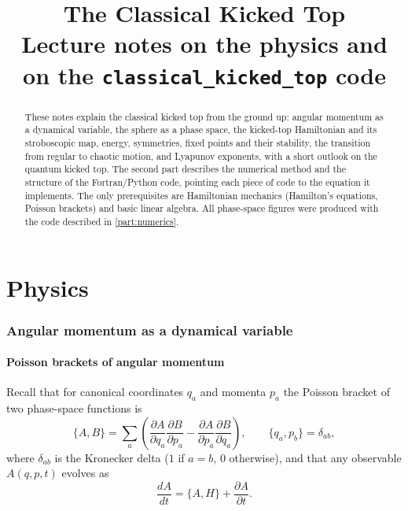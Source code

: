 \documentclass[11pt,a4paper]{article}
\title{The Classical Kicked Top\\[0.3em] \large Lecture notes on the physics and on the \texttt{classical\_kicked\_top} code}
\author{}
\date{}
\newcommand{\PB}[2]{\{#1,#2\}}
\begin{document}
\maketitle

\begin{abstract}
These notes explain the classical kicked top from the ground up: angular momentum as a dynamical variable, the
sphere as a phase space, the kicked-top Hamiltonian and its stroboscopic map, energy, symmetries, fixed points and
their stability, the transition from regular to chaotic motion, and Lyapunov exponents, with a short outlook on the
quantum kicked top. The second part describes the numerical method and the structure of the Fortran/Python code,
pointing each piece of code to the equation it implements. The only prerequisites are Hamiltonian mechanics
(Hamilton's equations, Poisson brackets) and basic linear algebra. All phase-space figures were produced with the code
described in \cref{part:numerics}.
\end{abstract}

\tableofcontents
\newpage

\part{Physics}

\section{Angular momentum as a dynamical variable}\label{sec:angmom}

\subsection{Poisson brackets of angular momentum}

Recall that for canonical coordinates $q_a$ and momenta $p_a$ the Poisson bracket of two phase-space functions is
\begin{equation}
  \PB{A}{B} = \sum_a \left( \frac{\partial A}{\partial q_a}\frac{\partial B}{\partial p_a}
                          - \frac{\partial A}{\partial p_a}\frac{\partial B}{\partial q_a} \right),
  \qquad \PB{q_a}{p_b} = \delta_{ab},
\end{equation}
where $\delta_{ab}$ is the Kronecker delta ($1$ if $a=b$, $0$ otherwise), and that any observable $A(q,p,t)$
evolves as
\begin{equation}\label{eq:eom-general}
  \frac{dA}{dt} = \PB{A}{H} + \frac{\partial A}{\partial t}.
\end{equation}
\end{document}

